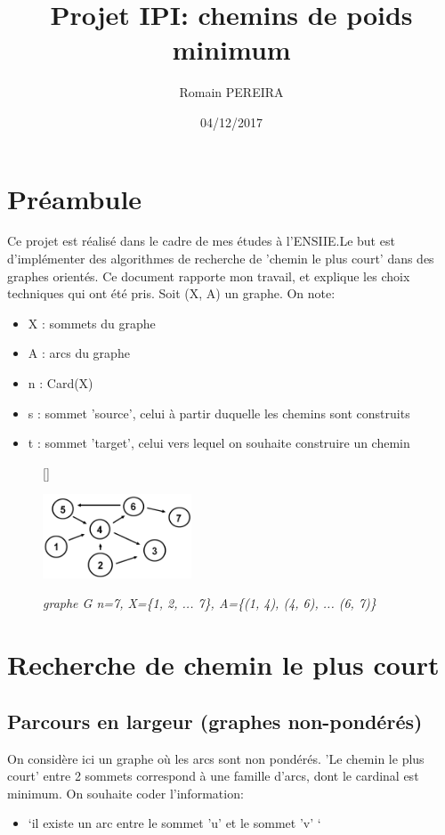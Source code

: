 \documentclass[10pt]{article}
\title{Projet IPI: chemins de poids minimum}
\author{Romain PEREIRA}
\date{04/12/2017}
\begin{document}
	\maketitle
	\tableofcontents

	\section*{Préambule}

		Ce projet est réalisé dans le cadre de mes études à l'ENSIIE.\newline Le but est d'implémenter des
		algorithmes de recherche de 'chemin le plus court' dans des graphes orientés.
		Ce document rapporte mon travail, et explique les choix techniques qui ont été pris.
		Soit (X, A) un graphe. On note:
		\begin{itemize}[label=-]
			\setlength\itemsep{0.1em}
			\item X : sommets du graphe
			\item A : arcs du graphe
			\item n : Card(X)
			\item s : sommet 'source', celui à partir duquelle les chemins sont construits
			\item t : sommet 'target', celui vers lequel on souhaite construire un chemin
		\end{itemize}

		\begin{figure}
			[\FBwidth]
			{\caption{\textit{\newline graphe G n=7, \newline X=\{1, 2, ... 7\}, \newline A=\{(1, 4), (4, 6), ... (6, 7)\}}}
			\label{graphe}}
			{\includegraphics[height=2.5cm]{./images/graph.png}}
		\end{figure}

	\newpage
	\section{Recherche de chemin le plus court}
		\subsection{Parcours en largeur (graphes non-pondérés)}
			On considère ici un graphe où les arcs sont non pondérés. 'Le chemin le plus court'
			entre 2 sommets correspond à une famille d'arcs, dont le cardinal est minimum.
			On souhaite coder l'information:
			\begin{itemize}[label=-]
				\item `il existe un arc entre le sommet 'u' et le sommet 'v' `
			\end{itemize}
			
\end{document}

